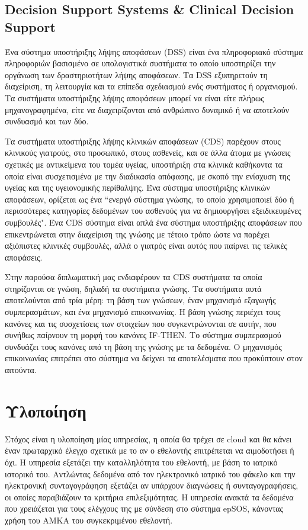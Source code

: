 		
	\subsection{Decision Support Systems \& Clinical Decision Support}
		
		Ένα σύστημα υποστήριξης λήψης αποφάσεων (DSS) είναι ένα πληροφοριακό σύστημα πληροφοριών βασισμένο σε υπολογιστικά συστήματα το οποίο υποστηρίζει την οργάνωση των δραστηριοτήτων λήψης αποφάσεων. Τα DSS εξυπηρετούν τη διαχείριση, τη λειτουργία και τα επίπεδα σχεδιασμού ενός συστήματος ή οργανισμού. Τα συστήματα υποστήριξης λήψης αποφάσεων μπορεί να είναι είτε πλήρως μηχανογραφημένα, είτε να διαχειρίζονται από ανθρώπινο δυναμικό  ή να αποτελούν συνδυασμό και των δύο. \cite{miller}
		
		Τα συστήματα υποστήριξης λήψης κλινικών αποφάσεων (CDS) παρέχουν στους κλινικούς γιατρούς, στο προσωπικό, στους ασθενείς, και σε άλλα άτομα με γνώσεις σχετικές με αντικείμενα του τομέα υγείας, υποστήριξη στα κλινικά καθήκοντα τα οποία είναι συσχετισμένα με την διαδικασία απόφασης, με σκοπό  την ενίσχυση της υγείας και της υγειονομικής περίθαλψης.\cite{clinicalDecision} Ένα σύστημα υποστήριξης κλινικών αποφάσεων, ορίζεται ως ένα ``ενεργό σύστημα γνώσης, το οποίο χρησιμοποιεί δύο ή περισσότερες κατηγορίες δεδομένων του ασθενούς για να δημιουργήσει εξειδικευμένες συμβουλές". Ένα CDS σύστημα είναι απλά ένα σύστημα υποστήριξης αποφάσεων που επικεντρώνεται στην διαχείριση της γνώσης με τέτοιο τρόπο ώστε να παρέχει αξιόπιστες κλινικές συμβουλές, αλλά ο γιατρός είναι αυτός που παίρνει τις τελικές αποφάσεις. \cite{miller}
		
		Στην παρούσα διπλωματική μας ενδιαφέρουν τα CDS συστήματα τα οποία στηρίζονται σε γνώση, δηλαδή τα συστήματα γνώσης. Τα συστήματα αυτά αποτελούνται από τρία μέρη: τη βάση των γνώσεων, έναν μηχανισμό εξαγωγής συμπερασμάτων, και ένα μηχανισμό επικοινωνίας. Η βάση γνώσης περιέχει τους κανόνες και τις συσχετίσεις των στοιχείων που συγκεντρώνονται σε αυτήν, που συνήθως παίρνουν τη μορφή του κανόνες IF-THEN. Το σύστημα συμπερασμού συνδυάζει τους κανόνες από τη βάση της γνώσης με τα δεδομένα. Ο μηχανισμός επικοινωνίας επιτρέπει στο σύστημα να δείχνει τα αποτελέσματα που προκύπτουν στον αιτούντα.
		
\section{Υλοποίηση}


		Στόχος είναι η υλοποίηση μίας υπηρεσίας, η οποία θα τρέχει σε cloud και θα κάνει έναν πρωταρχικό έλεγχο σχετικά με το αν ο εθελοντής επιτρέπεται να αιμοδοτήσει ή όχι. Η υπηρεσία εξετάζει την καταλληλότητα του εθελοντή, με βάση το ιατρικό ιστορικό του. Αντλώντας δεδομένα από τον ηλεκτρονικό ιατρικό του φάκελο και την ηλεκτρονική συνταγογράφηση εξετάζει αν υπάρχουν διαγνώσεις ή συνταγογραφήσεις, οι οποίες παραβιάζουν τα κριτήρια επιλεξιμότητας. Η υπηρεσία ανακτά τα δεδομένα που χρειάζεται για τους ελέγχους της με σύνδεση στο σύστημα epSOS, κάνοντας χρήση του ΑΜΚΑ του συγκεκριμένου εθελοντή.
		
